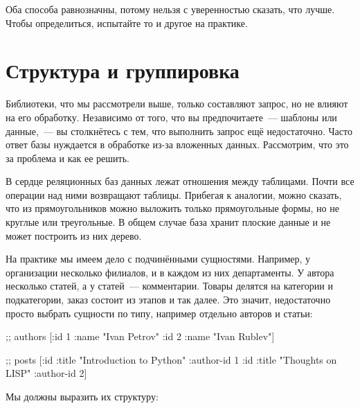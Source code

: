 Оба способа равнозначны, потому нельзя с уверенностью сказать, что лучше. Чтобы определиться, испытайте то и другое на практике.

\section{Структура и группировка}


Библиотеки, что мы рассмотрели выше, только составляют запрос, но не влияют на его обработку. Независимо от того, что вы предпочитаете~--- шаблоны или данные,~--- вы столкнётесь с тем, что выполнить запрос ещё недостаточно. Часто ответ базы нуждается в обработке из-за вложенных данных. Рассмотрим, что это за проблема и как ее решить.

В сердце реляционных баз данных лежат отношения между таблицами. Почти все операции над ними возвращают таблицы. Прибегая к аналогии, можно сказать, что из прямоугольников можно выложить только прямоугольные формы, но не круглые или треугольные. В общем случае база хранит плоские данные и не может построить из них дерево.

На практике мы имеем дело с подчинёнными сущностями. Например, у организации несколько филиалов, и в каждом из них департаменты. У автора несколько статей, а у статей~--- комментарии. Товары делятся на категории и подкатегории, заказ состоит из этапов и так далее. Это значит, недостаточно просто выбрать сущности по типу, например отдельно авторов и статьи:

\begin{english}
  \begin{clojure}
;; authors
[{:id 1 :name "Ivan Petrov"}
 {:id 2 :name "Ivan Rublev"}]

;; posts
[{:id :title "Introduction to Python" :author-id 1}
 {:id :title "Thoughts on LISP" :author-id 2}]
  \end{clojure}
\end{english}

Мы должны выразить их структуру:

\begin{english}
  \begin{clojure}
  \end{clojure}
\end{english}

